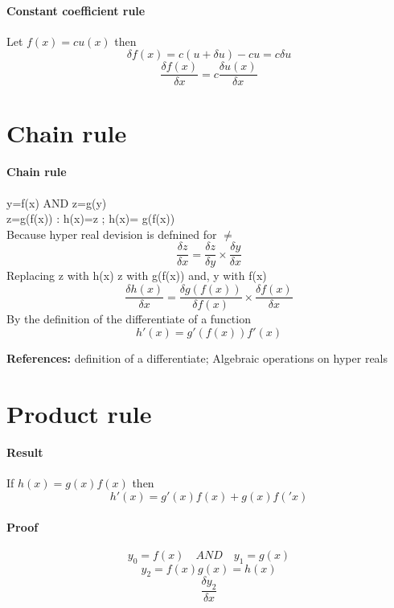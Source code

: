 \documentclass[12pt, a4paper,oneside]{book}
\begin{document}
\paragraph {Constant coefficient rule}
Let \(f(x) = cu(x)\) then
\[ \delta f(x) = c(u+\delta u) - cu = c\delta u\]
\[\frac{\delta f(x)}{\delta x}=c\frac{\delta u(x)}{\delta x}\]


\section{Chain rule}
\paragraph{Chain rule}
\begin{paragraph}
y=f(x) AND
z=g(y)\\
z=g(f(x)) : h(x)=z ; h(x)= g(f(x))\\
Because hyper real devision is defnined for \( \neq \)
\[\frac{\delta z}{\delta x}=\frac{\delta z}{\delta y} \times \frac{\delta y}{\delta x}\]
Replacing z with h(x) z with g(f(x)) and,  y with f(x) 
\[ \frac{\delta h(x)}{ \delta x} = \frac{ \delta g(f(x))}{\delta f(x)} \times \frac{\delta {f(x)}}{\delta x} \]
By the definition of the differentiate of a function
\[h'(x)=g'(f(x))f'(x)\]

\textbf{References:} definition of a differentiate; Algebraic operations on hyper reals
\end{paragraph}




\section{Product rule}
	\paragraph{Result}
	\begin{paragraph}
	If \(h(x)=g(x)f(x)\) then
	\[h'(x)=g'(x)f(x)+g(x)f('x)\]
	\end{paragraph}

	\paragraph{Proof}
    \begin{paragraph}
  	{\[y_0=f(x) \quad AND \quad y_1 = g(x)\]
    \[y_2=f(x)g(x)=h(x)\]
	\[\frac{\delta y_2}{\delta x}\]  }  
    \end{paragraph}
\end{document}
